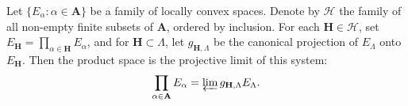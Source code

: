 Let $\{E_\alpha: \alpha \in \mathbf{A}\}$ be a family of locally convex spaces. Denote by $\mathcal{H}$ the family of all non-empty finite subsets of $\mathbf{A}$, ordered by inclusion. For each $\mathbf{H} \in \mathcal{H}$, set $E_{\mathbf{H}} = \prod_{\alpha \in \mathbf{H}} E_\alpha$, and for $\mathbf{H} \subset \Lambda$, let $g_{\mathbf{H}, \Lambda}$ be the canonical projection of $E_\Lambda$ onto $E_{\mathbf{H}}$. Then the product space is the projective limit of this system:
$$\prod_{\alpha \in \mathbf{A}} E_\alpha = \varprojlim g_{\mathbf{H}, \Lambda} E_\Lambda.$$
